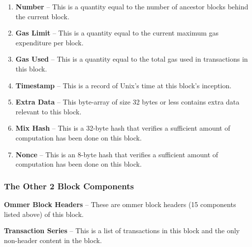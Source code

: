 \documentclass[10pt,letterpaper,leqno,bibliography=totoc]{scrartcl}
\newenvironment{alphafootnotes}
{\par\edef\savedfootnotenumber{\number\value{footnote}}
\renewcommand{\thefootnote}{\alph{footnote}}
\setcounter{footnote}{0}}
{\par\setcounter{footnote}{\savedfootnotenumber}}
\begin{document}
\begin{alphafootnotes}
\begin{multicols*}{2}
\begin{enumerate}
					\item \textbf{Number} -- This is a quantity equal to the number of ancestor blocks behind the current block.
					\item \textbf{Gas Limit} -- This is a quantity equal to the current maximum gas expenditure per block.
					\item \textbf{Gas Used} -- This is a quantity equal to the total gas used in transactions in this block.
					\item \textbf{Timestamp} -- This is a record of Unix's time at this block's inception.
					

					\item \textbf{Extra Data} -- This byte-array of size 32 bytes or less contains extra data relevant to this block.
					\item \textbf{Mix Hash} -- This is a 32-byte hash that verifies a sufficient amount of computation has been done on this block.
					\item \textbf{Nonce} -- This is an 8-byte hash that verifies a sufficient amount of computation has been done on this block.
				

					\end{enumerate}
				
					\subsubsection{The Other 2 Block Components}
					\item \textbf{Ommer Block Headers} -- These are ommer block headers (15 components listed above) of this block.
					\item \textbf{Transaction Series} -- This is a list of transactions in this block and the only non-header content in the block.

					

\end{multicols*}
\end{alphafootnotes}
\end{document}
